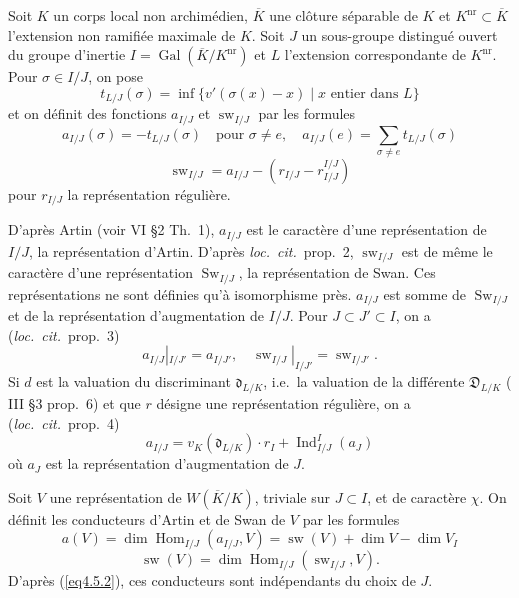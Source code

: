 \documentclass[11pt,a4paper]{amsart}
\theoremstyle{plain}
\theoremstyle{definition}
\DeclareMathOperator{\Ind}{Ind}
\DeclareMathOperator{\Hom}{Hom}
\DeclareMathOperator{\Gal}{Gal}
\DeclareMathOperator{\Sw}{Sw}
\newcommand{\nr}{\mathrm{nr}}
\DeclareMathOperator{\sw}{sw}
\def\dim{\mathop{\mathrm{dim}}\nolimits}
\newenvironment{para}{\par\noindent}{\par}
\newcommand{\ov}[1]{\overline{#1}}
\begin{document}
\begin{para}
Soit $K$ un corps local non archim\'edien, $\ov{K}$ une cl\^oture s\'eparable de $K$ et $K^{\nr} \subset \ov{K}$ l'extension non ramifi\'ee maximale de $K$. Soit $J$ un sous-groupe distingu\'e ouvert du groupe d'inertie $I = \Gal(\ov{K}/K^{\nr})$ et $L$ l'extension correspondante de $K^{\nr}$. Pour $\sigma \in I/J$, on pose
\[
t_{L/J}(\sigma) = \inf\{v'(\sigma(x) - x) \mid x \text{ entier dans } L\}
\]
et on d\'efinit des fonctions $a_{I/J}$ et $\sw_{I/J}$ par les formules
\begin{equation}\label{eq4.5.1}
a_{I/J}(\sigma) = -t_{L/J}(\sigma) \quad \text{pour } \sigma \not= e, \quad a_{I/J}(e) = \sum_{\sigma \not= e} t_{L/J}(\sigma)
\end{equation}
\[
\sw_{I/J} = a_{I/J} - (r_{I/J} - r_{I/J}^{I/J})
\]
pour $r_{I/J}$ la repr\'esentation r\'eguli\`ere.
\end{para}

D'apr\`es Artin (voir \cite{10} VI \S2 Th.~1), $a_{I/J}$ est le caract\`ere d'une repr\'esentation de $I/J$, la repr\'esentation d'Artin. D'apr\`es \textit{loc.~cit.}~prop.~2, $\sw_{I/J}$ est de m\^eme le caract\`ere d'une repr\'esentation $\Sw_{I/J}$, la repr\'esentation de Swan. Ces repr\'esentations ne sont d\'efinies qu'\`a isomorphisme pr\`es. $a_{I/J}$ est somme de $\Sw_{I/J}$ et de la repr\'esentation d'augmentation de $I/J$. Pour $J \subset J' \subset I$, on a (\textit{loc.~cit.}~prop.~3)
\begin{equation}\label{eq4.5.2}
a_{I/J}|_{I/J'} = a_{I/J'}, \quad \sw_{I/J}|_{I/J'} = \sw_{I/J'}.
\end{equation}
Si $d$ est la valuation du discriminant $\mathfrak{d}_{L/K}$, i.e.~la valuation de la diff\'erente $\mathfrak{D}_{L/K}$ (\cite{10} III \S3 prop.~6) et que $r$ d\'esigne une repr\'esentation r\'eguli\`ere, on a (\textit{loc.~cit.}~prop.~4)
\begin{equation}\label{eq4.5.3}
a_{I/J} = v_{K}(\mathfrak{d}_{L/K}) \cdot r_{I} + \Ind_{I/J}^{I}(a_{J})
\end{equation}
o\`u $a_{J}$ est la repr\'esentation d'augmentation de $J$.

\begin{para}
Soit $V$ une repr\'esentation de $W(\ov{K}/K)$, triviale sur $J \subset I$, et de caract\`ere $\chi$. On d\'efinit les conducteurs d'Artin et de Swan de $V$ par les formules
\begin{equation}\label{eq4.5.4}
a(V) = \dim \Hom_{I/J}(a_{I/J}, V) = \sw(V) + \dim V - \dim V_{I}
\end{equation}
\[
\sw(V) = \dim \Hom_{I/J}(\sw_{I/J}, V).
\]
D'apr\`es (\ref{eq4.5.2}), ces conducteurs sont ind\'ependants du choix de $J$.
\end{para}
\end{document}
